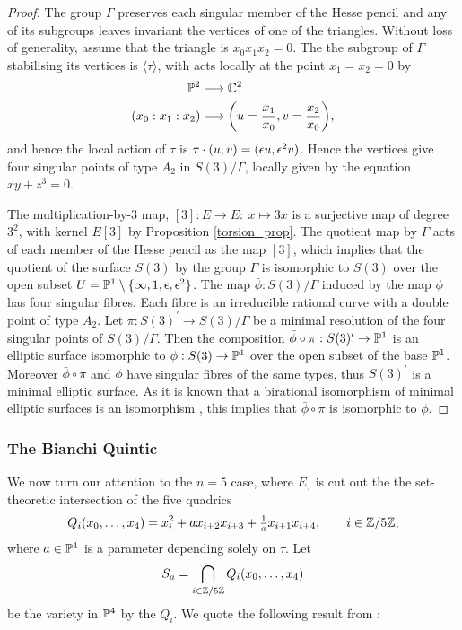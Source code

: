 \begin{proof}
	The group $\Gamma$ preserves each singular member of the Hesse pencil and any of its subgroups leaves invariant the vertices of one of the triangles. Without loss of generality, assume that the triangle is $x_{0}x_{1}x_{2} = 0$. The the subgroup of $\Gamma$ stabilising its vertices is $\langle \tau\rangle$, with acts locally at the point $x_{1} = x_{2} = 0$ by
	\begin{equation*}
	\begin{split}
	\mathbb{P}^{2} &\longrightarrow \mathbb{C}^{2}\\
	(x_{0}:x_{1}:x_{2}) &\longmapsto \bigg( u = \frac{x_{1}}{x_{0}}, v = \frac{x_{2}}{x_{0}}   \bigg),
	\end{split}
	\end{equation*}
	and hence the local action of $\tau$ is $\tau\cdot (u,v) = (\epsilon u, \epsilon^{2}v)$. Hence the vertices give four singular points of type $A_{2}$ in $S(3)/\Gamma$, locally given by the equation $xy + z^{3} = 0$.
	
	The multiplication-by-3 map, $[3]:E\rightarrow E:\ x\mapsto 3x$ is a surjective map of degree $3^{2}$, with kernel $E[3]$ by Proposition \ref{torsion_prop}. The quotient map by $\Gamma$ acts of each member of the Hesse pencil as the map $[3]$, which implies that the quotient of the surface $S(3)$ by the group $\Gamma$ is isomorphic to $S(3)$ over the open subset $U=\mathbb{P}^{1}\setminus \{\infty,1,\epsilon,\epsilon^{2}\}$. The map $\bar{\phi}:S(3)/\Gamma$ induced by the map $\phi$ has four singular fibres. Each fibre is an irreducible rational curve with a double point of type $A_{2}$. Let $\pi:S(3)^{\prime}\rightarrow S(3)/\Gamma$ be a minimal resolution of the four singular points of $S(3)/\Gamma$. Then the composition $\bar{\phi}\circ\pi:S(3)^{\prime} \rightarrow \mathbb{P}^{1}$ is an elliptic surface isomorphic to $\phi:S(3)\rightarrow \mathbb{P}^{1}$ over the open subset of the base $\mathbb{P}^{1}$. Moreover $\bar{\phi}\circ \pi$ and $\phi$ have singular fibres of the same types, thus $S(3)^{\prime}$ is a minimal elliptic surface. As it is known that a birational isomorphism of minimal elliptic surfaces is an isomorphism \cite{Dolgachev_2006}, this implies that $\bar{\phi}\circ\pi$ is isomorphic to $\phi$.
\end{proof}

\subsubsection{The Bianchi Quintic}

We now turn our attention to the $n = 5$ case, where $E_{\tau}$ is cut out the the set-theoretic intersection of the five quadrics
\begin{equation*}
Q_{i}(x_{0},\ldots,x_{4}) = x_{i}^{2} + ax_{i+2}x_{i+3} + \tfrac{1}{a}x_{i+1}x_{i+4},\qquad i \in \mathbb{Z}/5\mathbb{Z},
\end{equation*}
where $a \in \mathbb{P}^{1}$ is a parameter depending solely on $\tau$. Let
\begin{equation*}
	S_{a} = \bigcap_{i\in\mathbb{Z}/5\mathbb{Z}} Q_{i}(x_{0},\ldots,x_{4})
\end{equation*}
be the variety in $\mathbb{P}^{4}$ by the $Q_{i}$.
We quote the following result from \cite{Barth_1985}:\\

